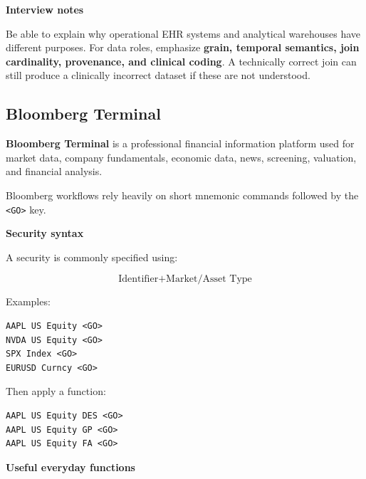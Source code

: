 \documentclass[11pt,letterpaper]{article}
\begin{document}
\textbf{Interview notes}

Be able to explain why operational EHR systems and analytical warehouses have
different purposes. For data roles, emphasize \textbf{grain, temporal
semantics, join cardinality, provenance, and clinical coding}. A technically
correct join can still produce a clinically incorrect dataset if these are not
understood.



\subsection{Bloomberg Terminal}

\textbf{Bloomberg Terminal} is a professional financial information platform
used for market data, company fundamentals, economic data, news, screening,
valuation, and financial analysis.

Bloomberg workflows rely heavily on short mnemonic commands followed by the
\texttt{<GO>} key.

\textbf{Security syntax}

A security is commonly specified using:

\[
\text{Identifier}
+
\text{Market/Asset Type}
\]

Examples:

\begin{lstlisting}
AAPL US Equity <GO>
NVDA US Equity <GO>
SPX Index <GO>
EURUSD Curncy <GO>
\end{lstlisting}

Then apply a function:

\begin{lstlisting}
AAPL US Equity DES <GO>
AAPL US Equity GP <GO>
AAPL US Equity FA <GO>
\end{lstlisting}

\textbf{Useful everyday functions}
\end{document}
